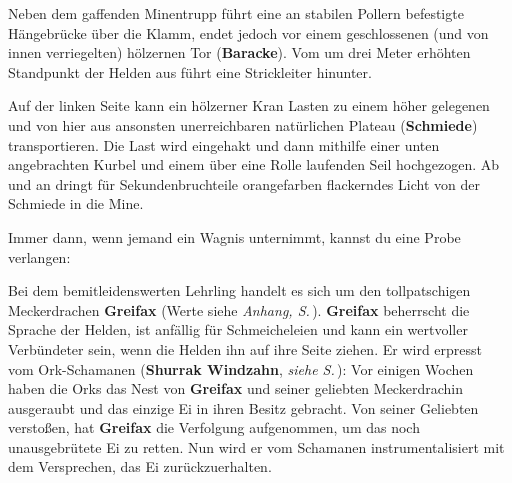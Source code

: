 Neben dem gaffenden Minentrupp führt eine an stabilen Pollern befestigte Hängebrücke über die Klamm, endet jedoch vor einem geschlossenen (und von innen verriegelten) hölzernen Tor (\textbf{Baracke}).
Vom um drei Meter erhöhten Standpunkt der Helden aus führt eine Strickleiter hinunter.

Auf der linken Seite kann ein hölzerner Kran Lasten zu einem höher gelegenen und von hier aus ansonsten unerreichbaren natürlichen Plateau (\textbf{Schmiede}) transportieren.
Die Last wird eingehakt und dann mithilfe einer unten angebrachten Kurbel und einem über eine Rolle laufenden Seil hochgezogen.
Ab und an dringt für Sekundenbruchteile orangefarben flackerndes Licht von der Schmiede in die Mine.

Immer dann, wenn jemand ein Wagnis unternimmt, kannst du eine Probe verlangen:


Bei dem bemitleidenswerten Lehrling handelt es sich um den tollpatschigen Meckerdrachen \textbf{Greifax} (Werte siehe \emph{Anhang, S.\,\pageref{greifax}}).
 \textbf{Greifax} beherrscht die Sprache der Helden, ist anfällig für Schmeicheleien und kann ein wertvoller Verbündeter sein, wenn die Helden ihn auf ihre Seite ziehen.
Er wird erpresst vom Ork-Schamanen (\textbf{Shurrak Windzahn}, \emph{siehe S.\,\pageref{finale}}):
Vor einigen Wochen haben die Orks das Nest von \textbf{Greifax} und seiner geliebten Meckerdrachin ausgeraubt und das einzige Ei in ihren Besitz gebracht.
Von seiner Geliebten verstoßen, hat \textbf{Greifax} die Verfolgung aufgenommen, um das noch unausgebrütete Ei zu retten.
Nun wird er vom Schamanen instrumentalisiert mit dem Versprechen, das Ei zurückzuerhalten.

